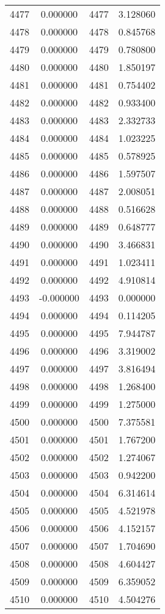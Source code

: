 \documentclass[12pt]{article}
\begin{document}
\begin{longtable}{@{}cccc@{}}
4477 & 0.000000 & 4477 & 3.128060 \\
4478 & 0.000000 & 4478 & 0.845768 \\
4479 & 0.000000 & 4479 & 0.780800 \\
4480 & 0.000000 & 4480 & 1.850197 \\
4481 & 0.000000 & 4481 & 0.754402 \\
4482 & 0.000000 & 4482 & 0.933400 \\
4483 & 0.000000 & 4483 & 2.332733 \\
4484 & 0.000000 & 4484 & 1.023225 \\
4485 & 0.000000 & 4485 & 0.578925 \\
4486 & 0.000000 & 4486 & 1.597507 \\
4487 & 0.000000 & 4487 & 2.008051 \\
4488 & 0.000000 & 4488 & 0.516628 \\
4489 & 0.000000 & 4489 & 0.648777 \\
4490 & 0.000000 & 4490 & 3.466831 \\
4491 & 0.000000 & 4491 & 1.023411 \\
4492 & 0.000000 & 4492 & 4.910814 \\
4493 & -0.000000 & 4493 & 0.000000 \\
4494 & 0.000000 & 4494 & 0.114205 \\
4495 & 0.000000 & 4495 & 7.944787 \\
4496 & 0.000000 & 4496 & 3.319002 \\
4497 & 0.000000 & 4497 & 3.816494 \\
4498 & 0.000000 & 4498 & 1.268400 \\
4499 & 0.000000 & 4499 & 1.275000 \\
4500 & 0.000000 & 4500 & 7.375581 \\
4501 & 0.000000 & 4501 & 1.767200 \\
4502 & 0.000000 & 4502 & 1.274067 \\
4503 & 0.000000 & 4503 & 0.942200 \\
4504 & 0.000000 & 4504 & 6.314614 \\
4505 & 0.000000 & 4505 & 4.521978 \\
4506 & 0.000000 & 4506 & 4.152157 \\
4507 & 0.000000 & 4507 & 1.704690 \\
4508 & 0.000000 & 4508 & 4.604427 \\
4509 & 0.000000 & 4509 & 6.359052 \\
4510 & 0.000000 & 4510 & 4.504276 \\

\end{longtable}
\end{document}
